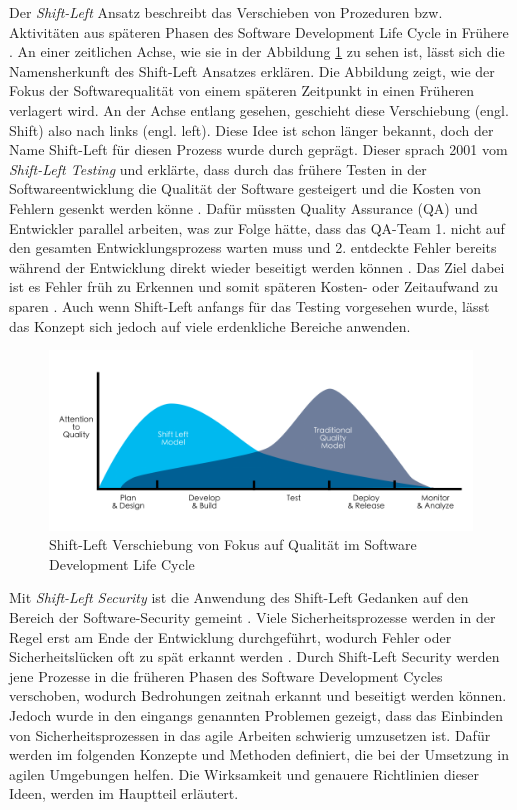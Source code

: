 Der \textit{Shift-Left} Ansatz beschreibt das Verschieben von Prozeduren bzw. Aktivitäten aus späteren Phasen des Software Development Life Cycle in Frühere \cite{andriadi_impact_2023}. An einer zeitlichen Achse, wie sie in der Abbildung \ref{fig:shiftleft} zu sehen ist, lässt sich die Namensherkunft des Shift-Left Ansatzes erklären. Die Abbildung zeigt, wie der Fokus der Softwarequalität von einem späteren Zeitpunkt in einen Früheren verlagert wird. An der Achse entlang gesehen, geschieht diese Verschiebung (engl. Shift) also nach links (engl. left). Diese Idee ist schon länger bekannt, doch der Name Shift-Left für diesen Prozess wurde durch \citet{smith_shift-left_2001} geprägt. Dieser sprach 2001 vom \textit{Shift-Left Testing} und erklärte, dass durch das frühere Testen in der Softwareentwicklung die Qualität der Software gesteigert und die Kosten von Fehlern gesenkt werden könne \cite{dawoud_better_2024}. Dafür müssten Quality Assurance (QA) und Entwickler parallel arbeiten, was zur Folge hätte, dass das QA-Team 1. nicht auf den gesamten Entwicklungsprozess warten muss und 2. entdeckte Fehler bereits während der Entwicklung direkt wieder beseitigt werden können \cite{andriadi_impact_2023}. Das Ziel dabei ist es Fehler früh zu Erkennen und somit späteren Kosten- oder Zeitaufwand zu sparen \cite{dawoud_better_2024}. Auch wenn Shift-Left anfangs für das Testing vorgesehen wurde, lässt das Konzept sich jedoch auf viele erdenkliche Bereiche anwenden.

\begin{figure}
    \centering
    \includegraphics[width=0.9\linewidth]{images/Shift_Left.png}
    \caption{Shift-Left Verschiebung von Fokus auf Qualität im Software Development Life Cycle \cite{andriadi_impact_2023}}
    \label{fig:shiftleft}
\end{figure}

Mit \textit{Shift-Left Security} ist die Anwendung des Shift-Left Gedanken auf den Bereich der Software-Security gemeint \cite{dawoud_better_2024}. Viele Sicherheitsprozesse werden in der Regel erst am Ende der Entwicklung durchgeführt, wodurch Fehler oder Sicherheitslücken oft zu spät erkannt werden \cite{dawoud_better_2024}. Durch Shift-Left Security werden jene Prozesse in die früheren Phasen des Software Development Cycles verschoben, wodurch Bedrohungen zeitnah erkannt und beseitigt werden können. Jedoch wurde in den eingangs genannten Problemen gezeigt, dass das Einbinden von Sicherheitsprozessen in das agile Arbeiten schwierig umzusetzen ist. Dafür werden im folgenden Konzepte und Methoden definiert, die bei der Umsetzung in agilen Umgebungen helfen. Die Wirksamkeit und genauere Richtlinien dieser Ideen, werden im Hauptteil erläutert.


